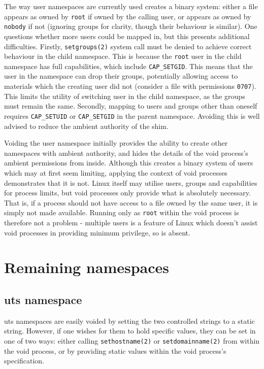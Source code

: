 \documentclass[12pt,a4paper,twoside]{report}
\begin{document}
The way user namespaces are currently used creates a binary system: either a file appears as owned by \texttt{root} if owned by the calling user, or appears as owned by \texttt{nobody} if not (ignoring groups for clarity, though their behaviour is similar). One questions whether more users could be mapped in, but this presents additional difficulties. Firstly, \texttt{setgroups(2)} system call must be denied to achieve correct behaviour in the child namespace. This is because the \texttt{root} user in the child namespace has full capabilities, which include \texttt{CAP\_SETGID}. This means that the user in the namespace can drop their groups, potentially allowing access to materials which the creating user did not (consider a file with permissions \texttt{0707}). This limits the utility of switching user in the child namespace, as the groups must remain the same. Secondly, mapping to users and groups other than oneself requires \texttt{CAP\_SETUID} or \texttt{CAP\_SETGID} in the parent namespace. Avoiding this is well advised to reduce the ambient authority of the shim.

Voiding the user namespace initially provides the ability to create other namespaces with ambient authority, and hides the details of the void process's ambient permissions from inside. Although this creates a binary system of users which may at first seem limiting, applying the context of void processes demonstrates that it is not. Linux itself may utilise users, groups and capabilities for process limits, but void processes only provide what is absolutely necessary. That is, if a process should not have access to a file owned by the same user, it is simply not made available. Running only as \texttt{root} within the void process is therefore not a problem - multiple users is a feature of Linux which doesn't assist void processes in providing minimum privilege, so is absent.

\section{Remaining namespaces}

\subsection{uts namespace}
\label{sec:filling-uts}

uts namespaces are easily voided by setting the two controlled strings to a static string. However, if one wishes for them to hold specific values, they can be set in one of two ways: either calling \texttt{sethostname(2)} or \texttt{setdomainname(2)} from within the void process, or by providing static values within the void process's specification.
\end{document}
